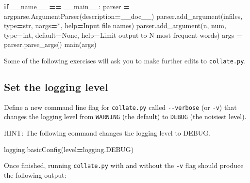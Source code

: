 \documentclass[
]{krantz}
\makeatletter
\newenvironment{Shaded}{\begin{snugshade}}{\end{snugshade}}
\newcommand{\BuiltInTok}[1]{#1}
\newcommand{\ControlFlowTok}[1]{\textcolor[rgb]{0.13,0.29,0.53}{\textbf{#1}}}
\newcommand{\NormalTok}[1]{#1}
\newcommand{\OperatorTok}[1]{\textcolor[rgb]{0.81,0.36,0.00}{\textbf{#1}}}
\newcommand{\StringTok}[1]{\textcolor[rgb]{0.31,0.60,0.02}{#1}}
\newcommand{\VariableTok}[1]{\textcolor[rgb]{0.00,0.00,0.00}{#1}}
\newenvironment{kframe}{%
\medskip{}
\setlength{\fboxsep}{.8em}
 \def\at@end@of@kframe{}%
 \ifinner\ifhmode%
  \def\at@end@of@kframe{\end{minipage}}%
  \begin{minipage}{\columnwidth}%
 \fi\fi%
 \def\FrameCommand##1{\hskip\@totalleftmargin \hskip-\fboxsep
 \colorbox{shadecolor}{##1}\hskip-\fboxsep
     \hskip-\linewidth \hskip-\@totalleftmargin \hskip\columnwidth}%
 \MakeFramed {\advance\hsize-\width
   \@totalleftmargin\z@ \linewidth\hsize
   \@setminipage}}%
 {\par\unskip\endMakeFramed%
 \at@end@of@kframe}
\renewenvironment{Shaded}{\begin{kframe}}{\end{kframe}}
\makeatother
\begin{document}
\begin{Shaded}
\begin{Highlighting}[]
\ControlFlowTok{if} \VariableTok{\_\_name\_\_} \OperatorTok{==} \StringTok{\textquotesingle{}\_\_main\_\_\textquotesingle{}}\NormalTok{:}
\NormalTok{    parser }\OperatorTok{=}\NormalTok{ argparse.ArgumentParser(description}\OperatorTok{=}\NormalTok{\_\_doc\_\_)}
\NormalTok{    parser.add\_argument(}\StringTok{\textquotesingle{}infiles\textquotesingle{}}\NormalTok{, }\BuiltInTok{type}\OperatorTok{=}\BuiltInTok{str}\NormalTok{, nargs}\OperatorTok{=}\StringTok{\textquotesingle{}*\textquotesingle{}}\NormalTok{, }\BuiltInTok{help}\OperatorTok{=}\StringTok{\textquotesingle{}Input file names\textquotesingle{}}\NormalTok{)}
\NormalTok{    parser.add\_argument(}\StringTok{\textquotesingle{}{-}n\textquotesingle{}}\NormalTok{, }\StringTok{\textquotesingle{}{-}{-}num\textquotesingle{}}\NormalTok{, }\BuiltInTok{type}\OperatorTok{=}\BuiltInTok{int}\NormalTok{, default}\OperatorTok{=}\VariableTok{None}\NormalTok{,}
                        \BuiltInTok{help}\OperatorTok{=}\StringTok{\textquotesingle{}Limit output to N most frequent words\textquotesingle{}}\NormalTok{)}
\NormalTok{    args }\OperatorTok{=}\NormalTok{ parser.parse\_args()}
\NormalTok{    main(args)}
\end{Highlighting}
\end{Shaded}

Some of the following exercises will ask you to make further edits to \texttt{collate.py}.

\hypertarget{errors-ex-set-level}{%
\subsection{Set the logging level}\label{errors-ex-set-level}}

Define a new command line flag for \texttt{collate.py} called \texttt{-\/-verbose} (or \texttt{-v})
that changes the logging level from \texttt{WARNING} (the default)
to \texttt{DEBUG} (the noisiest level).

HINT: The following command changes the logging level to DEBUG.

\begin{Shaded}
\begin{Highlighting}[]
\NormalTok{logging.basicConfig(level}\OperatorTok{=}\NormalTok{logging.DEBUG)}
\end{Highlighting}
\end{Shaded}

Once finished,
running \texttt{collate.py} with and without the \texttt{-v} flag should produce the following output:
\end{document}
